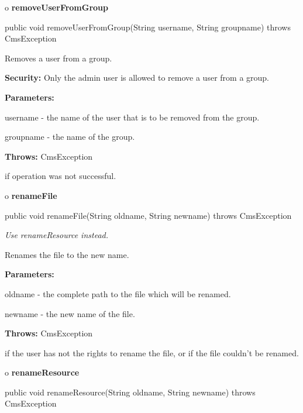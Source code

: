 o {\bf removeUserFromGroup}

\begin{PRE}
 public void removeUserFromGroup(String username,
                                 String groupname) throws CmsException
\end{PRE}

\begin{description}
\htmlDD Removes a user from a group.

{\bf Security:} Only the admin user is allowed to remove a user from a group.

\begin{description}
\item {\bf Parameters:}

username - the name of the user that is to be removed from the group.

groupname - the name of the group.
\item {\bf Throws:} CmsException

if operation was not successful.
\end{description}

\end{description}

o {\bf renameFile}

\begin{PRE}
 public void renameFile(String oldname,
                        String newname) throws CmsException
\end{PRE}

\begin{description}
 {\it Use renameResource
instead.}

Renames the file to the new name.

\begin{description}
\item {\bf Parameters:}

oldname - the complete path to the file which will be renamed.

newname - the new name of the file.
\item {\bf Throws:} CmsException

if the user has not the rights to rename the file, or if the file couldn't be
renamed.
\end{description}

\end{description}

o {\bf renameResource}

\begin{PRE}
 public void renameResource(String oldname,
                            String newname) throws CmsException
\end{PRE}

